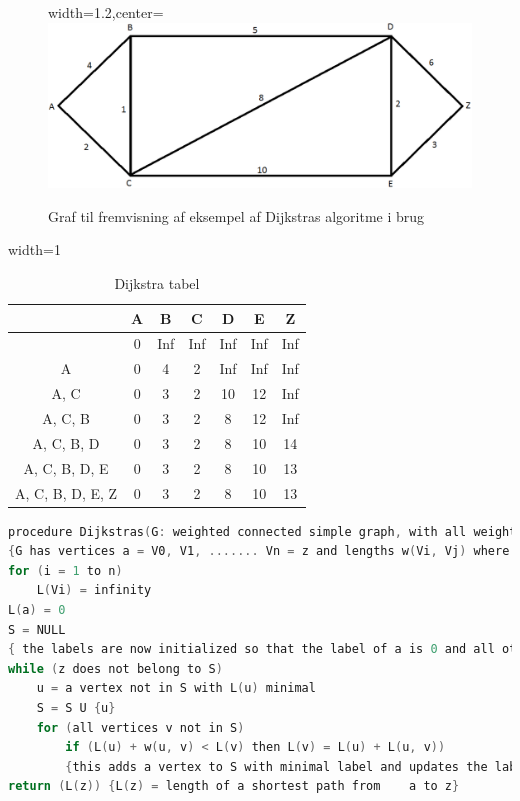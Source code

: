\begin{figure}[H]
\begin{adjustbox}{width=1.2\textwidth,center=\textwidth}
\centering
\includegraphics[width=1.2\textwidth]{Pictures/Teoriafsnit/Figurfiler/dijkstrasgraf.png}
\end{adjustbox}
\caption{Graf til fremvisning af eksempel af Dijkstras algoritme i brug}
\label{fig:dijkstrasgraf}
\end{figure}

\begin{table}[H]
\centering
\begin{adjustbox}{width=1\textwidth}
\Large
\begin{tabular}{| c | c | c | c | c | c | c |}
	\hline
	 & A & B & C & D & E & Z \\
	\hline
	 & 0 & Inf & Inf & Inf & Inf & Inf \\
	\hline
	{A} & 0 & 4 & 2 & Inf & Inf & Inf \\
	\hline
	{A, C} & 0 & 3 & 2 & 10 & 12 & Inf \\
	\hline
	{A, C, B} & 0 & 3 & 2 & 8 & 12 & Inf \\
	\hline
	{A, C, B, D} & 0 & 3 & 2 & 8 & 10 & 14 \\
	\hline
	{A, C, B, D, E} & 0 & 3 & 2 & 8 & 10 & 13 \\
	\hline
	{A, C, B, D, E, Z} & 0 & 3 & 2 & 8 & 10 & 13 \\
	\hline
\end{tabular}
\end{adjustbox}
\caption{Dijkstra tabel}\label{fig:dijkstratabel}
\end{table}

\begin{lstlisting}[language=C,caption={Dijkstras angivet som eksempel i pseudo-kode},label={lst:DijsktrasPseudo1}]
	procedure Dijkstras(G: weighted connected simple graph, with all weights positive)
{G has vertices a = V0, V1, ....... Vn = z and lengths w(Vi, Vj) where w(Vi,Vj) = infinity if{Vi, Vj} is not an edge in G}
for (i = 1 to n)
	L(Vi) = infinity
L(a) = 0
S = NULL
{ the labels are now initialized so that the label of a is 0 and all other labels are infinity, and S is the empty set }
while (z does not belong to S)
	u = a vertex not in S with L(u) minimal
	S = S U {u}
	for (all vertices v not in S)
		if (L(u) + w(u, v) < L(v) then L(v) = L(u) + L(u, v))
		{this adds a vertex to S with minimal label and updates the labels of vertices not in S}
return (L(z)) {L(z) = length of a shortest path from 	a to z}
\end{lstlisting}